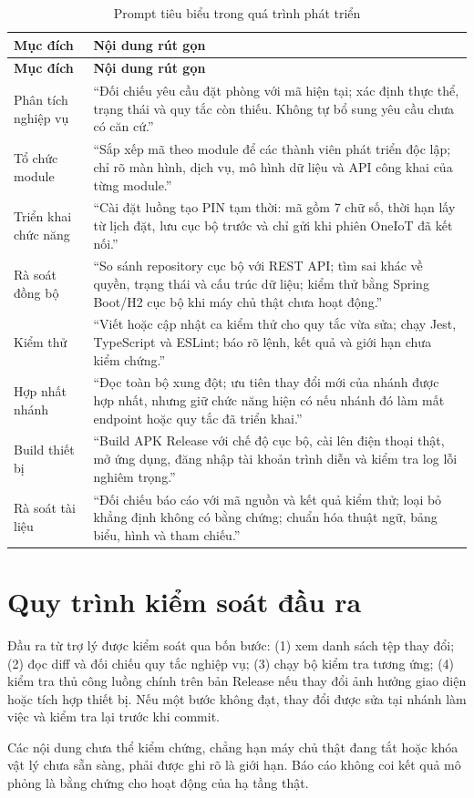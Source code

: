 \begin{longtable}{>{\raggedright\arraybackslash}p{3.0cm}>{\raggedright\arraybackslash}p{10.0cm}}
\caption{Prompt tiêu biểu trong quá trình phát triển}\label{tab:prompts}\\
\toprule
\rowcolor{RoomHubLight}
\textbf{Mục đích} & \textbf{Nội dung rút gọn} \\
\midrule
\endfirsthead
\toprule
\rowcolor{RoomHubLight}
\textbf{Mục đích} & \textbf{Nội dung rút gọn} \\
\midrule
\endhead
\bottomrule
\endfoot
Phân tích nghiệp vụ & ``Đối chiếu yêu cầu đặt phòng với mã hiện tại; xác định thực thể, trạng thái và quy tắc còn thiếu. Không tự bổ sung yêu cầu chưa có căn cứ.'' \\
Tổ chức module & ``Sắp xếp mã theo module để các thành viên phát triển độc lập; chỉ rõ màn hình, dịch vụ, mô hình dữ liệu và API công khai của từng module.'' \\
Triển khai chức năng & ``Cài đặt luồng tạo PIN tạm thời: mã gồm 7 chữ số, thời hạn lấy từ lịch đặt, lưu cục bộ trước và chỉ gửi khi phiên OneIoT đã kết nối.'' \\
Rà soát đồng bộ & ``So sánh repository cục bộ với REST API; tìm sai khác về quyền, trạng thái và cấu trúc dữ liệu; kiểm thử bằng Spring Boot/H2 cục bộ khi máy chủ thật chưa hoạt động.'' \\
Kiểm thử & ``Viết hoặc cập nhật ca kiểm thử cho quy tắc vừa sửa; chạy Jest, TypeScript và ESLint; báo rõ lệnh, kết quả và giới hạn chưa kiểm chứng.'' \\
Hợp nhất nhánh & ``Đọc toàn bộ xung đột; ưu tiên thay đổi mới của nhánh được hợp nhất, nhưng giữ chức năng hiện có nếu nhánh đó làm mất endpoint hoặc quy tắc đã triển khai.'' \\
Build thiết bị & ``Build APK Release với chế độ cục bộ, cài lên điện thoại thật, mở ứng dụng, đăng nhập tài khoản trình diễn và kiểm tra log lỗi nghiêm trọng.'' \\
Rà soát tài liệu & ``Đối chiếu báo cáo với mã nguồn và kết quả kiểm thử; loại bỏ khẳng định không có bằng chứng; chuẩn hóa thuật ngữ, bảng biểu, hình và tham chiếu.'' \\
\end{longtable}

\section{Quy trình kiểm soát đầu ra}

Đầu ra từ trợ lý được kiểm soát qua bốn bước: (1) xem danh sách tệp thay đổi; (2) đọc diff và đối chiếu quy tắc nghiệp vụ; (3) chạy bộ kiểm tra tương ứng; (4) kiểm tra thủ công luồng chính trên bản Release nếu thay đổi ảnh hưởng giao diện hoặc tích hợp thiết bị. Nếu một bước không đạt, thay đổi được sửa tại nhánh làm việc và kiểm tra lại trước khi commit.

Các nội dung chưa thể kiểm chứng, chẳng hạn máy chủ thật đang tắt hoặc khóa vật lý chưa sẵn sàng, phải được ghi rõ là giới hạn. Báo cáo không coi kết quả mô phỏng là bằng chứng cho hoạt động của hạ tầng thật.